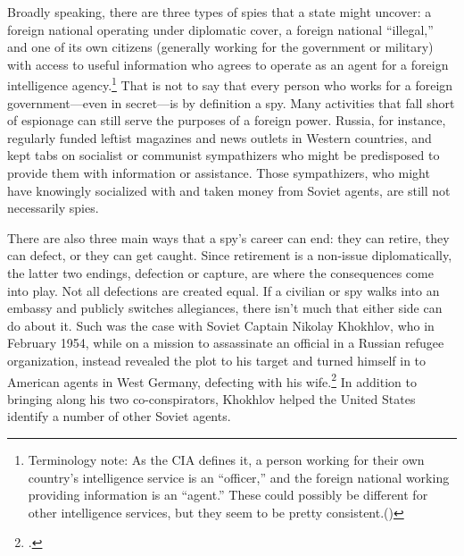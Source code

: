 \documentclass{memoir}
\begin{document}
\begin{refsegment}
Broadly speaking, there are three types of spies that a state might uncover: a foreign national operating under diplomatic cover, a foreign national ``illegal,'' and one of its own citizens (generally working for the government or military) with access to useful information who agrees to operate as an agent for a foreign intelligence agency.\footnote{Terminology note: As the CIA defines it, a person working for their own country's intelligence service is an ``officer,'' and the foreign national working providing information is an ``agent.'' These could possibly be different for other intelligence services, but they seem to be pretty consistent.(\cite{cia_insider_2019})} That is not to say that every person who works for a foreign government---even in secret---is by definition a spy. Many activities that fall short of espionage can still serve the purposes of a foreign power. Russia, for instance, regularly funded leftist magazines and news outlets in Western countries, and kept tabs on socialist or communist sympathizers who might be predisposed to provide them with information or assistance. Those sympathizers, who might have knowingly socialized with and taken money from Soviet agents, are still not necessarily spies.

There are also three main ways that a spy's career can end: they can retire, they can defect, or they can get caught. Since retirement is a non-issue diplomatically, the latter two endings, defection or capture, are where the consequences come into play. Not all defections are created equal. If a civilian or spy walks into an embassy and publicly switches allegiances, there isn't much that either side can do about it. Such was the case with Soviet Captain Nikolay Khokhlov, who in February 1954, while on a mission to assassinate an official in a Russian refugee organization, instead revealed the plot to his target and turned himself in to American agents in West Germany, defecting with his wife.\footcite[Captain Khoklov repeatedly emphasized at the press conference that his decision to defect was inspired by his wife Yanina, who told him that ``she would never permit their child to have an assasin as a father.'']{handler_another_1954} In addition to bringing along his two co-conspirators, Khokhlov helped the United States identify a number of other Soviet agents.


\end{refsegment}
\end{document}
